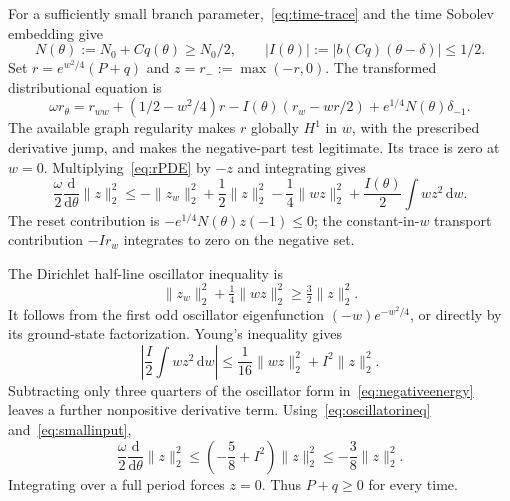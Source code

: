 \documentclass[11pt,a4paper]{article}
\numberwithin{equation}{section}
\theoremstyle{remark}\newtheorem{remark}[theorem]{Remark}
\newcommand{\dd}{\,\mathrm d}
\begin{document}
For a sufficiently small branch parameter,~\eqref{eq:time-trace} and the time Sobolev embedding give
\begin{equation}\label{eq:smallinput}
 N(\theta):=N_0+Cq(\theta)\geq N_0/2,
 \qquad |I(\theta)|:=|b(Cq)(\theta-\delta)|\leq1/2.
\end{equation}
Set $r=e^{w^2/4}(P+q)$ and $z=r_-:=\max(-r,0)$. The transformed distributional equation is
\begin{equation}\label{eq:rPDE}
 \omega r_\theta=r_{ww}+(1/2-w^2/4)r
 -I(\theta)(r_w-wr/2)+e^{1/4}N(\theta)\delta_{-1}.
\end{equation}
The available graph regularity makes $r$ globally $H^1$ in $w$, with the prescribed derivative jump, and makes the negative-part test legitimate. Its trace is zero at $w=0$. Multiplying~\eqref{eq:rPDE} by $-z$ and integrating gives
\begin{equation}\label{eq:negativeenergy}
 \frac\omega2\frac{\mathrm d}{\mathrm d\theta}\|z\|_2^2
 \leq-\|z_w\|_2^2+\frac12\|z\|_2^2
       -\frac14\|wz\|_2^2+
       \frac{I(\theta)}2\int w z^2\dd w.
\end{equation}
The reset contribution is $-e^{1/4}N(\theta)z(-1)\leq0$; the constant-in-$w$ transport contribution $-I r_w$ integrates to zero on the negative set.

The Dirichlet half-line oscillator inequality is
\begin{equation}\label{eq:oscillatorineq}
 \|z_w\|_2^2+\tfrac14\|wz\|_2^2\geq\tfrac32\|z\|_2^2.
\end{equation}
It follows from the first odd oscillator eigenfunction $(-w)e^{-w^2/4}$, or directly by its ground-state factorization. Young's inequality gives
\[
 \left|\frac I2\int wz^2\dd w\right|
 \leq\frac1{16}\|wz\|_2^2+I^2\|z\|_2^2.
\]
Subtracting only three quarters of the oscillator form in~\eqref{eq:negativeenergy} leaves a further nonpositive derivative term. Using~\eqref{eq:oscillatorineq} and~\eqref{eq:smallinput},
\[
 \frac\omega2\frac{\mathrm d}{\mathrm d\theta}\|z\|_2^2
 \leq\left(-\frac58+I^2\right)\|z\|_2^2
 \leq-\frac38\|z\|_2^2.
\]
Integrating over a full period forces $z=0$. Thus $P+q\geq0$ for every time.
\end{document}
